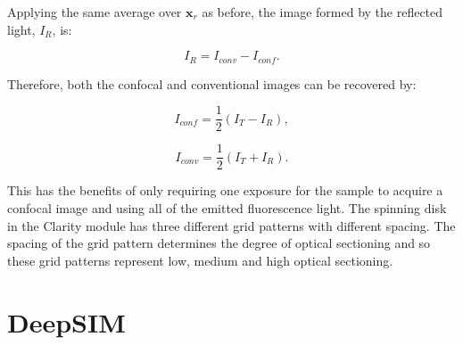 Applying the same average over $\textbf{x}_{r}$ as before, 
the image formed by the reflected light, $I_{R}$, is:

\begin{equation}\label{eq:reflected_image}
I_{R} = I_{conv} - I_{conf}.
\end{equation}

Therefore, both the confocal and conventional images can 
be recovered by:

\begin{equation}\label{eq:confocal_image}
I_{conf} = \frac{1}{2}\left(I_{T} - I_{R}\right),
\end{equation}

\begin{equation}\label{eq:conventional_image}
I_{conv} = \frac{1}{2}\left(I_{T} + I_{R}\right).
\end{equation}

This has the benefits of only requiring one exposure for 
the sample to acquire a confocal image and using all of 
the emitted fluorescence light. The spinning disk in the 
Clarity module has three different grid patterns with 
different spacing. The spacing of the grid pattern determines
the degree of optical sectioning and so these grid patterns
represent low, medium and high optical sectioning\cite{neil1997method}.

\section{DeepSIM}
\label{sec:DeepSIM}

